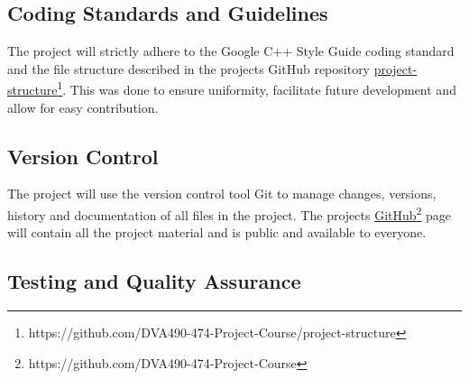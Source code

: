 \subsection{Coding Standards and Guidelines}

The project will strictly adhere to the Google C++ Style Guide coding standard and the file structure described in the projects GitHub repository \href{https://github.com/DVA490-474-Project-Course/project-structure}{project-structure}\footnote{https://github.com/DVA490-474-Project-Course/project-structure}. This was done to ensure uniformity, facilitate future development and allow for easy contribution. 



\subsection{Version Control}
\label{subsection:version_control}

The project will use the version control tool Git to manage changes, versions, history and documentation of all files in the project. The projects \href{https://github.com/DVA490-474-Project-Course}{GitHub}\footnote{https://github.com/DVA490-474-Project-Course} page will contain all the project material and is public and available to everyone.



\subsection{Testing and Quality Assurance}


